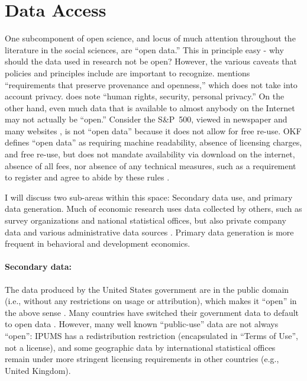 \documentclass{article}
\begin{document}


\section{Data Access}
\label{sec:data_access}

One subcomponent of open science, and locus of much attention throughout the literature in the social sciences, are ``open data.'' This in principle easy - why should the data used in research not be open? However, the various caveats that policies and principles include are important to recognize. \parencite[OKF]{open_knowledge_foundation_defining_2024} mentions ``requirements that preserve provenance and openness,'' which does not take into account privacy. \citet{unesco_understanding_2022} does note  ``human rights, security, personal privacy.'' On the other hand, even much data that is available to almost anybody on the Internet may not actually be ``open.''  Consider the S\&P~500, viewed in newspaper and many websites \parencite[e.g.][]{sp_dow_jones_indices_llc_sp_2025}, is not ``open data'' because it does not allow for free re-use. OKF defines 
``open data'' as requiring machine readability, absence of licensing charges, and free re-use, but does not mandate availability via download on the internet, absence of all fees, nor absence of any technical measures, such as a requirement to register and agree to abide by these rules \citep{open_knowledge_foundation_defining_2024}. 

I will discuss two sub-areas within this space: Secondary data use, and primary data generation. Much of economic research uses data collected by others, such as survey organizations and national statistical offices, but also private company data and various administrative data sources \citep[``organic data'', ][]{groves_designed_2011,groves_three_2011}. Primary data generation is more frequent in behavioral and development economics. 

\paragraph{Secondary data:} The data produced by the United States government are in the public domain (i.e., without any restrictions on usage or attribution), which makes it ``open'' in the above sense \citep[Copyright Act of 1976, ][]{wikipedia_copyright_2025}. Many countries have switched their government data to default to open data \parencite{statistics_canada_statistics_2012,uk_government_open_2014}. However, many well known ``public-use'' data are not always ``open'': IPUMS has a redistribution restriction (encapsulated in ``Terms of Use'', not a license), and some geographic data by international statistical offices remain under more stringent licensing requirements in other countries (e.g., United Kingdom).
\end{document}
